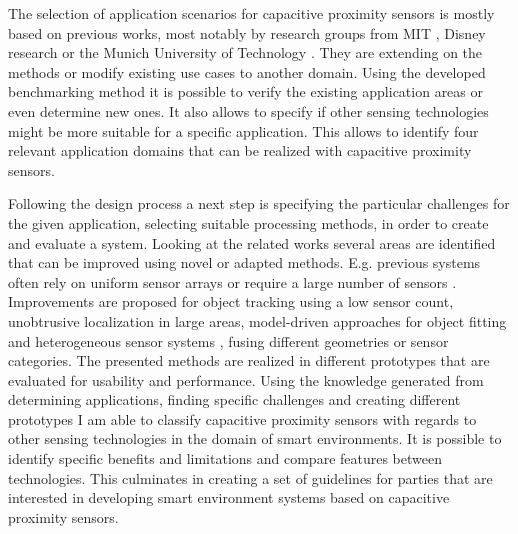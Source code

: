 The selection of application scenarios for capacitive proximity sensors is mostly based on previous works, most notably by research groups from MIT \cite{Paradiso2002}, Disney research \cite{Sato2012} or the Munich University of Technology \cite{Wimmer2006}. They are extending on the methods or modify existing use cases to another domain. Using the developed benchmarking method it is possible to verify the existing application areas or even determine new ones. It also allows to specify if other sensing technologies might be more suitable for a specific application. This allows to identify four relevant application domains that can be realized with capacitive proximity sensors. 

Following the design process a next step is specifying the particular challenges for the given application, selecting suitable processing methods, in order to create and evaluate a system. Looking at the related works several areas are identified that can be improved using novel or adapted methods. E.g. previous systems often rely on uniform sensor arrays \cite{Smith1996a} or require a large number of sensors \cite{rekimoto2002smartskin}. Improvements are proposed for object tracking using a low sensor count, unobtrusive localization in large areas, model-driven approaches for object fitting and heterogeneous sensor systems , fusing different geometries or sensor categories. The presented methods are realized in different prototypes that are evaluated for usability and performance.
Using the knowledge generated from determining applications, finding specific challenges and creating different prototypes I am able to classify capacitive proximity sensors with regards to other sensing technologies in the domain of smart environments. It is possible to identify specific benefits and limitations and compare features between technologies. This culminates in creating a set of guidelines for parties that are interested in developing smart environment systems based on capacitive proximity sensors.


